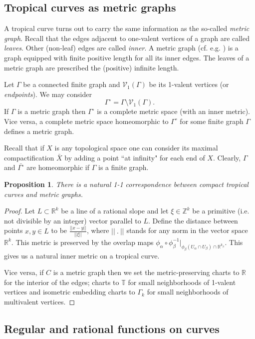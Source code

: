 \documentclass[12pt]{amsart}
\theoremstyle{plain}
\newtheorem{proposition}[theorem]{Proposition}
\theoremstyle{definition}
\theoremstyle{remark}
\newcommand{\Z}{\mathbb Z}    %
\newcommand{\R}{\mathbb R}    %
\newcommand{\<}{\langle}   %
\renewcommand{\>}{\rangle} %
\newcommand{\Rtr}{\mathbb T}
\begin{document}
\subsection{Tropical curves as metric graphs}

A tropical curve turns out to carry the same information as
the so-called {\em metric graph}. Recall that the edges adjacent to
one-valent vertices of a graph are called {\em leaves}.
Other (non-leaf) edges are called {\em inner}.
A metric graph (cf. e.g. \cite{Biomath}) is a graph
equipped with finite positive length for all its inner edges.
The leaves of a metric graph are prescribed the (positive) infinite length.

Let $\Gamma$ be a connected finite graph and ${\mathcal V}_1(\Gamma)$
be its 1-valent vertices (or {\em endpoints}).
We may consider
$$\Gamma^\circ=\Gamma\setminus{\mathcal V_1}(\Gamma).$$
If $\Gamma$ is a metric graph then $\Gamma^\circ$ is a complete
metric space (with an inner metric). Vice versa, a complete
metric space homeomorphic to $\Gamma^\circ$ for some finite graph $\Gamma$
defines a metric graph.

Recall that if $X$ is any topological space one can consider
its maximal compactification $\bar{X}$ by adding a point ``at infinity"
for each end of $X$. Clearly, $\Gamma$ and
$\bar{\Gamma^\circ}$ are homeomorphic if $\Gamma$ is a finite graph.

\begin{proposition}
There is a natural 1-1 correspondence between compact tropical curves
and metric graphs.
\end{proposition}
\begin{proof}
Let $L\subset\R^k$ be a line of a rational slope
and let $\xi\in\Z^k$ be a primitive (i.e. not divisible by
an integer)
vector parallel to $L$. Define the distance between
points $x,y\in L$ to be $\frac{||x-y||}{||\xi||}$,
where $||\ .\ ||$ stands for any norm in the vector space $\R^k$.
This metric is preserved by the overlap maps
$\phi_\alpha\circ\phi_\beta^{-1}
|_{\phi_\beta(U_\alpha\cap U_\beta)\cap\R^{k_\beta}}$.
This gives us a natural inner metric on a tropical curve.

Vice versa, if $C$ is a metric graph then we set
the metric-preserving charts to $\R$ for the interior of the edges;
charts to $\Rtr$ for small neighborhoods of 1-valent vertices and
isometric embedding charts to $\Gamma_k$ for small
neighborhoods of multivalent vertices.
\end{proof}

\subsection{Regular and rational functions on curves}
\end{document}
